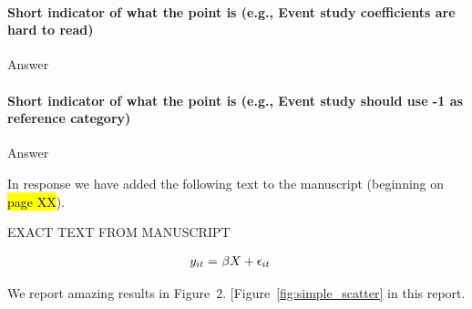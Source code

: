 \documentclass[11pt,leqno]{article}
\begin{document}

\paragraph{Short indicator of what the point is (e.g., Event study coefficients are hard to read)} Answer 

\paragraph{Short indicator of what the point is (e.g., Event study should use -1 as reference category)} Answer 

In response we have added the following text to the manuscript (beginning on \hl{page XX}).
    
	\begin{tcolorbox}[left = 1em, top = 1ex, bottom = 1ex, colupper=black, colback=white, adjusted title = From page \hl{XX}]
    
       EXACT TEXT FROM MANUSCRIPT
    
        \begin{align}
            y_{it} = &~\beta X + \epsilon_{it} \notag
        \end{align}
        
        We report amazing results in Figure~2. {\color{red} {\ttfamily[Figure~\ref{fig:simple_scatter} in this report.}} \\

        {\color{red} {}} \\
    \end{tcolorbox}    
    
\end{document}
